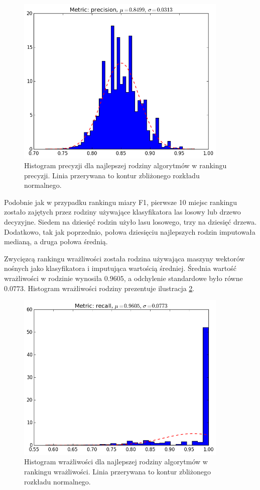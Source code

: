 \documentclass[../thesis.tex]{subfiles}
\begin{document}
\begin{figure}[h]
\centering
\includegraphics[width=0.9\textwidth]{13-precision.png}
\caption{Histogram precyzji dla najlepszej rodziny algorytmów w rankingu precyzji. Linia przerywana to kontur zbliżonego rozkładu normalnego.}
\label{results:histogram_p_best}
\end{figure}

Podobnie jak w przypadku rankingu miary F1, pierwsze 10 miejsc rankingu zostało zajętych przez rodziny używające klasyfikatora las losowy lub drzewo decyzyjne. Siedem na dziesięć rodzin użyło lasu losowego, trzy na dziesięć drzewa. Dodatkowo, tak jak poprzednio, połowa dziesięciu najlepszych rodzin imputowała medianą, a druga połowa średnią.

Zwycięzcą rankingu wrażliwości została rodzina używająca maszyny wektorów nośnych jako klasyfikatora i imputująca wartością średniej. Średnia wartość wrażliwości w rodzinie wynosiła $0.9605$, a odchylenie standardowe było równe $0.0773$. Histogram wrażliwości rodziny prezentuje ilustracja \ref{results:histogram_r_best}. 

\begin{figure}[h]
\centering
\includegraphics[width=0.9\textwidth]{68-recall.png}
\caption{Histogram wrażliwości dla najlepszej rodziny algorytmów w rankingu wrażliwości. Linia przerywana to kontur zbliżonego rozkładu normalnego.}
\label{results:histogram_r_best}
\end{figure}
\end{document}
